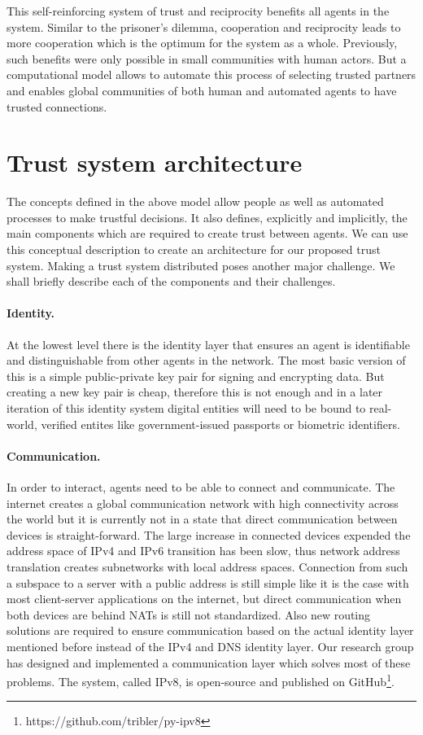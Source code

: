 This self-reinforcing system of trust and reciprocity benefits all agents in the system. Similar to 
the prisoner's dilemma, cooperation and reciprocity leads to more cooperation which is the optimum 
for the system as a whole. Previously, such benefits were only possible in small communities with 
human actors. But a computational model allows to automate this process of selecting trusted partners
and enables global communities of both human and automated agents to have trusted connections.

\section{Trust system architecture}
The concepts defined in the above model allow people as well as automated processes to make 
trustful decisions. It also defines, explicitly and implicitly, the main components which are 
required to create trust between agents. We can use this conceptual description to create an 
architecture for our proposed trust system. Making a trust system distributed poses another major 
challenge. We shall briefly describe each of the components and their challenges. 

\paragraph{Identity.} At the lowest level there is the identity layer that ensures an agent is 
identifiable and distinguishable from other agents in the network. The most basic version of this is 
a simple public-private key pair for signing and encrypting data. But creating a new key pair is cheap, therefore 
this is not enough and in a later iteration of this identity system digital entities will need to be 
bound to real-world, verified entites like government-issued passports or biometric identifiers. 

\paragraph{Communication.} In order to interact, agents need to be able to connect and communicate.
The internet creates a global communication network with high connectivity
across the world but it is currently not in a state that direct communication between devices is 
straight-forward. The large increase in connected devices expended the address space of IPv4 and IPv6
transition has been slow, thus network address translation creates subnetworks with local address 
spaces. Connection from such a subspace to a server with a public address is still simple like it is
the case with most client-server applications on the internet, but direct communication when both 
devices are behind NATs is still not standardized. Also new routing solutions are required to ensure
communication based on the actual identity layer mentioned before instead of the IPv4 and DNS identity
layer. Our research group has designed and implemented a communication layer which solves most of 
these problems. The system, called IPv8, is open-source and published on GitHub\footnote{https://github.com/tribler/py-ipv8}.

